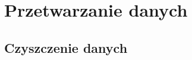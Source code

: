 \section{Przetwarzanie danych}\label{sec:przetwarzanie_danych}
\subsection{Czyszczenie danych}\label{subsec:czyszczenie_danych}
